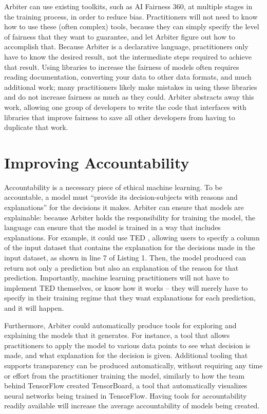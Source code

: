\documentclass[letterpaper]{article}
\newcommand{\citep}[1]{\cite{#1}}
\begin{document}
Arbiter can use existing toolkits, such as AI Fairness 360, at multiple stages in the training process, in order to reduce bias. Practitioners will not need to know how to use these (often complex) tools, because they can simply specify the level of fairness that they want to guarantee, and let Arbiter figure out how to accomplish that. Because Arbiter is a declarative language, practitioners only have to know the desired result, not the intermediate steps required to achieve that result. Using libraries to increase the fairness of models often requires reading documentation, converting your data to other data formats, and much additional work; many practitioners likely make mistakes in using these libraries and do not increase fairness as much as they could. Arbiter abstracts away this work, allowing one group of developers to write the code that interfaces with libraries that improve fairness to save all other developers from having to duplicate that work.

\section{Improving Accountability}
Accountability is a necessary piece of ethical machine learning. To be accountable, a model must ``provide its decision-subjects with reasons and explanations'' \citep{Binns2017} for the decisions it makes. Arbiter can ensure that models are explainable: because Arbiter holds the responsibility for training the model, the language can ensure that the model is trained in a way that includes explanations. For example, it could use TED \citep{Hind2019}, allowing users to specify a column of the input dataset that contains the explanation for the decisions made in the input dataset, as shown in line 7 of Listing 1. Then, the model produced can return not only a prediction but also an explanation of the reason for that prediction. Importantly, machine learning practitioners will not have to implement TED themselves, or know how it works -- they will merely have to specify in their training regime that they want explanations for each prediction, and it will happen. 

Furthermore, Arbiter could automatically produce tools for exploring and explaining the models that it generates. For instance, a tool that allows practitioners to apply the model to various data points to see what decision is made, and what explanation for the decision is given. Additional tooling that supports transparency can be produced automatically, without requiring any time or effort from the practitioner training the model, similarly to how the team behind TensorFlow created TensorBoard, a tool that automatically visualizes neural networks being trained in TensorFlow. Having tools for accountability readily available will increase the average accountability of models being created.
\end{document}
